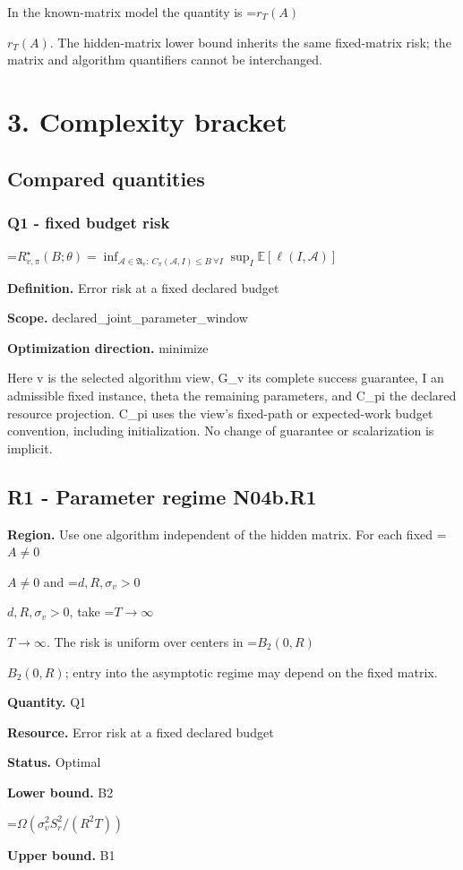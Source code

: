 \documentclass[10pt,a4paper]{article}
\newcommand{\AtlasMath}[1]{\par\begingroup\centering\setbox0=\hbox{$\displaystyle #1$}\ifdim\wd0>1.4\linewidth\typeout{ATLAS WIDE FORMULA: \the\wd0}\fi\ifdim\wd0>\linewidth\resizebox{\linewidth}{!}{\box0}\else\box0\fi\par\endgroup}
\newcommand{\AtlasInlineMath}[1]{\begingroup\setbox0=\hbox{$#1$}\ifdim\wd0>.4\linewidth\endgroup\AtlasMath{#1}\else\endgroup$#1$\fi}
\begin{document}
In the known-matrix model the quantity is \AtlasInlineMath{r_T(A)}. The hidden-matrix lower bound inherits the same fixed-matrix risk; the matrix and algorithm quantifiers cannot be interchanged.

\section{3. Complexity bracket}
\subsection{Compared quantities}
\subsubsection{Q1 - fixed budget risk}
\AtlasMath{R^\star_{v,\pi}(B;\theta)=\inf_{\mathcal A\in\mathfrak A_v:\ C_\pi(\mathcal A,I)\le B\ \forall I}\sup_I\mathbb E[\ell(I,\mathcal A)]}
\textbf{Definition.} Error risk at a fixed declared budget

\textbf{Scope.} declared\_joint\_parameter\_window

\textbf{Optimization direction.} minimize

Here v is the selected algorithm view, G\_v its complete success guarantee, I an admissible fixed instance, theta the remaining parameters, and C\_pi the declared resource projection. C\_pi uses the view's fixed-path or expected-work budget convention, including initialization. No change of guarantee or scalarization is implicit.

\subsection{R1 - Parameter regime N04b.R1}
\textbf{Region.} Use one algorithm independent of the hidden matrix. For each fixed \AtlasInlineMath{A\ne0} and \AtlasInlineMath{d,R,\sigma_v>0}, take \AtlasInlineMath{T\to\infty}. The risk is uniform over centers in \AtlasInlineMath{B_2(0,R)}; entry into the asymptotic regime may depend on the fixed matrix.

\textbf{Quantity.} Q1

\textbf{Resource.} Error risk at a fixed declared budget

\textbf{Status.} Optimal

\textbf{Lower bound.} B2

\AtlasMath{\Omega(\sigma_v^2S_r^2/(R^2T))}
\textbf{Upper bound.} B1
\end{document}
